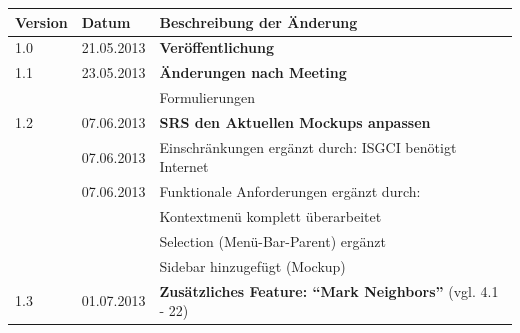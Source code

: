 \documentclass[10pt,a4paper]{article}
\begin{document}
\hspace*{-1cm}
\begin{tabular}{|l|l|p{10.5cm}|}\hline
 \textbf{Version}&\textbf{Datum}&\textbf{Beschreibung der \"Anderung}\\\hline
 1.0&21.05.2013&\textbf{Veröffentlichung}\\\hline
 1.1&23.05.2013& \textbf{Änderungen nach Meeting} \\\hline
   & & Formulierungen \\\hline
 1.2& 07.06.2013 & \textbf{SRS den Aktuellen Mockups anpassen} \\\hline
 & 07.06.2013 &  Einschränkungen ergänzt durch: ISGCI benötigt Internet  \\\hline
  & 07.06.2013 &  Funktionale Anforderungen ergänzt durch:  \\\hline
   &  &  Kontextmenü komplett überarbeitet \\\hline 
    &  &  Selection (Menü-Bar-Parent) ergänzt \\\hline
     &  &  Sidebar hinzugefügt (Mockup) \\\hline
      1.3& 01.07.2013 & \textbf{Zusätzliches Feature: "`Mark Neighbors"'} (vgl. 4.1 - 22) \\\hline
 
 
 
\end{tabular}\\

 \newpage
 
 
 
 

%
%
%
\end{document}
